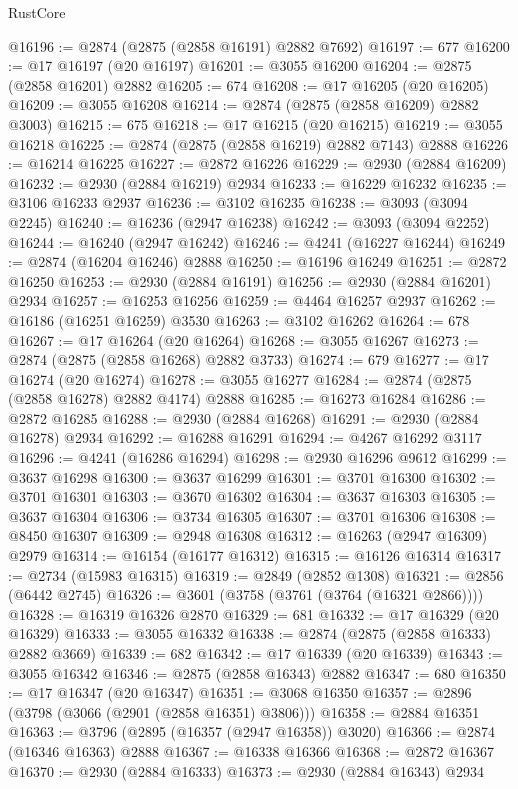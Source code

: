 \begin{lexlean}{RustCore}
\begin{coremodule}
@16196 := @2874 (@2875 (@2858 @16191) @2882 @7692)
@16197 := 677
@16200 := @17 @16197 (@20 @16197)
@16201 := @3055 @16200
@16204 := @2875 (@2858 @16201) @2882
@16205 := 674
@16208 := @17 @16205 (@20 @16205)
@16209 := @3055 @16208
@16214 := @2874 (@2875 (@2858 @16209) @2882 @3003)
@16215 := 675
@16218 := @17 @16215 (@20 @16215)
@16219 := @3055 @16218
@16225 := @2874 (@2875 (@2858 @16219) @2882 @7143) @2888
@16226 := @16214 @16225
@16227 := @2872 @16226
@16229 := @2930 (@2884 @16209)
@16232 := @2930 (@2884 @16219) @2934
@16233 := @16229 @16232
@16235 := @3106 @16233 @2937
@16236 := @3102 @16235
@16238 := @3093 (@3094 @2245)
@16240 := @16236 (@2947 @16238)
@16242 := @3093 (@3094 @2252)
@16244 := @16240 (@2947 @16242)
@16246 := @4241 (@16227 @16244)
@16249 := @2874 (@16204 @16246) @2888
@16250 := @16196 @16249
@16251 := @2872 @16250
@16253 := @2930 (@2884 @16191)
@16256 := @2930 (@2884 @16201) @2934
@16257 := @16253 @16256
@16259 := @4464 @16257 @2937
@16262 := @16186 (@16251 @16259) @3530
@16263 := @3102 @16262
@16264 := 678
@16267 := @17 @16264 (@20 @16264)
@16268 := @3055 @16267
@16273 := @2874 (@2875 (@2858 @16268) @2882 @3733)
@16274 := 679
@16277 := @17 @16274 (@20 @16274)
@16278 := @3055 @16277
@16284 := @2874 (@2875 (@2858 @16278) @2882 @4174) @2888
@16285 := @16273 @16284
@16286 := @2872 @16285
@16288 := @2930 (@2884 @16268)
@16291 := @2930 (@2884 @16278) @2934
@16292 := @16288 @16291
@16294 := @4267 @16292 @3117
@16296 := @4241 (@16286 @16294)
@16298 := @2930 @16296 @9612
@16299 := @3637 @16298
@16300 := @3637 @16299
@16301 := @3701 @16300
@16302 := @3701 @16301
@16303 := @3670 @16302
@16304 := @3637 @16303
@16305 := @3637 @16304
@16306 := @3734 @16305
@16307 := @3701 @16306
@16308 := @8450 @16307
@16309 := @2948 @16308
@16312 := @16263 (@2947 @16309) @2979
@16314 := @16154 (@16177 @16312)
@16315 := @16126 @16314
@16317 := @2734 (@15983 @16315)
@16319 := @2849 (@2852 @1308)
@16321 := @2856 (@6442 @2745)
@16326 := @3601 (@3758 (@3761 (@3764 (@16321 @2866))))
@16328 := @16319 @16326 @2870
@16329 := 681
@16332 := @17 @16329 (@20 @16329)
@16333 := @3055 @16332
@16338 := @2874 (@2875 (@2858 @16333) @2882 @3669)
@16339 := 682
@16342 := @17 @16339 (@20 @16339)
@16343 := @3055 @16342
@16346 := @2875 (@2858 @16343) @2882
@16347 := 680
@16350 := @17 @16347 (@20 @16347)
@16351 := @3068 @16350
@16357 := @2896 (@3798 (@3066 (@2901 (@2858 @16351) @3806)))
@16358 := @2884 @16351
@16363 := @3796 (@2895 (@16357 (@2947 @16358)) @3020)
@16366 := @2874 (@16346 @16363) @2888
@16367 := @16338 @16366
@16368 := @2872 @16367
@16370 := @2930 (@2884 @16333)
@16373 := @2930 (@2884 @16343) @2934

\end{coremodule}
\end{lexlean}
